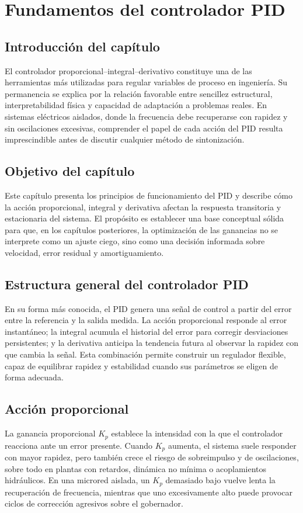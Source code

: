 \chapter{Fundamentos del controlador PID}
\label{ch:fundamentos-pid}

\section{Introducción del capítulo}
El controlador proporcional--integral--derivativo constituye una de las herramientas más
utilizadas para regular variables de proceso en ingeniería. Su permanencia se explica por la
relación favorable entre sencillez estructural, interpretabilidad física y capacidad de
adaptación a problemas reales. En sistemas eléctricos aislados, donde la frecuencia debe
recuperarse con rapidez y sin oscilaciones excesivas, comprender el papel de cada acción
del PID resulta imprescindible antes de discutir cualquier método de sintonización.

\section{Objetivo del capítulo}
Este capítulo presenta los principios de funcionamiento del PID y describe cómo la acción
proporcional, integral y derivativa afectan la respuesta transitoria y estacionaria del sistema.
El propósito es establecer una base conceptual sólida para que, en los capítulos posteriores,
la optimización de las ganancias no se interprete como un ajuste ciego, sino como una
decisión informada sobre velocidad, error residual y amortiguamiento.

\section{Estructura general del controlador PID}
En su forma más conocida, el PID genera una señal de control a partir del error entre la
referencia y la salida medida. La acción proporcional responde al error instantáneo; la
integral acumula el historial del error para corregir desviaciones persistentes; y la derivativa
anticipa la tendencia futura al observar la rapidez con que cambia la señal. Esta combinación
permite construir un regulador flexible, capaz de equilibrar rapidez y estabilidad cuando sus
parámetros se eligen de forma adecuada.

\section{Acción proporcional}
La ganancia proporcional $K_p$ establece la intensidad con la que el controlador reacciona
ante un error presente. Cuando $K_p$ aumenta, el sistema suele responder con mayor rapidez,
pero también crece el riesgo de sobreimpulso y de oscilaciones, sobre todo en plantas con
retardos, dinámica no mínima o acoplamientos hidráulicos. En una microred aislada, un
$K_p$ demasiado bajo vuelve lenta la recuperación de frecuencia, mientras que uno
excesivamente alto puede provocar ciclos de corrección agresivos sobre el gobernador.

